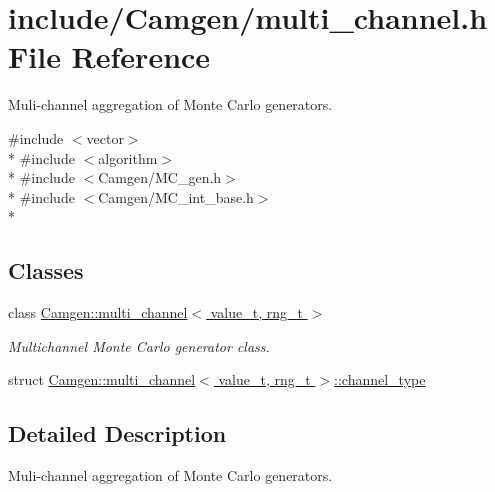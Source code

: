 \hypertarget{a00698}{}\section{include/\+Camgen/multi\+\_\+channel.h File Reference}
\label{a00698}


Muli-\/channel aggregation of Monte Carlo generators.  


{\ttfamily \#include $<$vector$>$}\\*
{\ttfamily \#include $<$algorithm$>$}\\*
{\ttfamily \#include $<$Camgen/\+M\+C\+\_\+gen.\+h$>$}\\*
{\ttfamily \#include $<$Camgen/\+M\+C\+\_\+int\+\_\+base.\+h$>$}\\*
\subsection*{Classes}
\begin{DoxyCompactItemize}
\item 
class \hyperlink{a00379}{Camgen\+::multi\+\_\+channel$<$ value\+\_\+t, rng\+\_\+t $>$}
\begin{DoxyCompactList}\small\item\em Multichannel Monte Carlo generator class. \end{DoxyCompactList}\item 
struct \hyperlink{a00061}{Camgen\+::multi\+\_\+channel$<$ value\+\_\+t, rng\+\_\+t $>$\+::channel\+\_\+type}
\end{DoxyCompactItemize}


\subsection{Detailed Description}
Muli-\/channel aggregation of Monte Carlo generators. 

